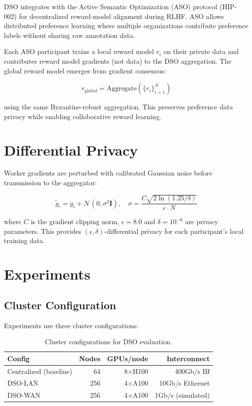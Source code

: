 \documentclass[11pt,a4paper]{article}
\begin{document}
DSO integrates with the Active Semantic Optimization (ASO) protocol (HIP-002) for
decentralized reward-model alignment during RLHF. ASO allows distributed preference
learning where multiple organizations contribute preference labels without sharing
raw annotation data.

Each ASO participant trains a local reward model $r_i$ on their private data and
contributes reward model gradients (not data) to the DSO aggregation. The global
reward model emerges from gradient consensus:

\begin{equation}
r_\text{global} = \text{Aggregate}(\{r_i\}_{i=1}^N)
\end{equation}

using the same Byzantine-robust aggregation. This preserves preference data privacy
while enabling collaborative reward learning.

\section{Differential Privacy}

Worker gradients are perturbed with calibrated Gaussian noise before transmission
to the aggregator:

\begin{equation}
\tilde{g}_i = g_i + \mathcal{N}(0, \sigma^2 \mathbf{I}), \quad \sigma = \frac{C \sqrt{2 \ln(1.25/\delta)}}{\epsilon \cdot N}
\end{equation}

where $C$ is the gradient clipping norm, $\epsilon = 8.0$ and $\delta = 10^{-6}$ are
privacy parameters. This provides $(\epsilon, \delta)$-differential privacy for each
participant's local training data.

\section{Experiments}

\subsection{Cluster Configuration}

Experiments use three cluster configurations:
\begin{table}[H]
\centering
\begin{tabular}{lrrr}
\toprule
\textbf{Config} & \textbf{Nodes} & \textbf{GPUs/node} & \textbf{Interconnect} \\
\midrule
Centralized (baseline) & 64 & 8$\times$H100 & 400Gb/s IB \\
DSO-LAN & 256 & 4$\times$A100 & 10Gb/s Ethernet \\
DSO-WAN & 256 & 4$\times$A100 & 1Gb/s (simulated) \\
\bottomrule
\end{tabular}
\caption{Cluster configurations for DSO evaluation.}
\end{table}
\end{document}

